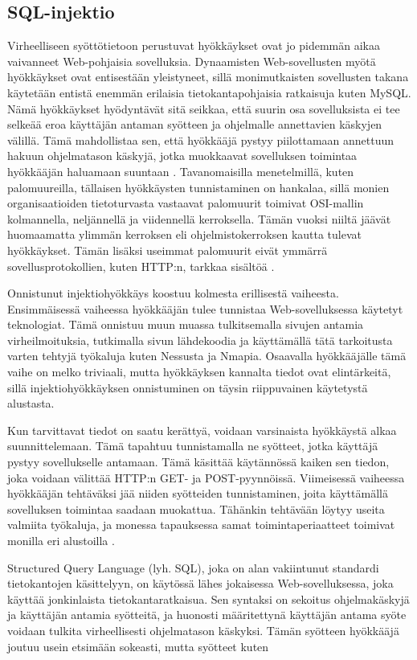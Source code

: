 \subsection{SQL-injektio}

Virheelliseen syöttötietoon perustuvat hyökkäykset ovat jo pidemmän aikaa vaivanneet Web-pohjaisia sovelluksia.
Dynaamisten Web-sovellusten myötä hyökkäykset ovat entisestään yleistyneet, sillä monimutkaisten sovellusten takana käytetään entistä
enemmän erilaisia tietokantapohjaisia ratkaisuja kuten MySQL. Nämä hyökkäykset hyödyntävät sitä seikkaa, että suurin osa
sovelluksista ei tee selkeää eroa käyttäjän antaman syötteen ja ohjelmalle annettavien käskyjen välillä. Tämä mahdollistaa
sen, että hyökkääjä pystyy piilottamaan annettuun hakuun ohjelmatason käskyjä, jotka muokkaavat sovelluksen toimintaa
hyökkääjän haluamaan suuntaan \cite{WEB2}. Tavanomaisilla
menetelmillä, kuten palomuureilla, tällaisen hyökkäysten tunnistaminen on hankalaa, sillä
monien organisaatioiden tietoturvasta vastaavat palomuurit toimivat OSI-mallin
kolmannella, neljännellä ja viidennellä kerroksella. Tämän vuoksi
niiltä jäävät huomaamatta ylimmän kerroksen eli ohjelmistokerroksen
kautta tulevat hyökkäykset. Tämän lisäksi useimmat palomuurit eivät
ymmärrä sovellusprotokollien,
kuten HTTP:n, tarkkaa sisältöä \cite{SQLSS}.    

Onnistunut injektiohyökkäys koostuu kolmesta erillisestä vaiheesta. Ensimmäisessä vaiheessa hyökkääjän tulee tunnistaa 
Web-sovelluksessa käytetyt teknologiat. Tämä onnistuu muun muassa tulkitsemalla sivujen antamia virheilmoituksia, tutkimalla 
sivun lähdekoodia ja käyttämällä tätä tarkoitusta varten tehtyjä työkaluja kuten Nessusta ja Nmapia. Osaavalla hyökkääjälle tämä vaihe on melko triviaali, 
mutta hyökkäyksen kannalta tiedot ovat elintärkeitä, sillä injektiohyökkäyksen onnistuminen on täysin riippuvainen 
käytetystä alustasta.

Kun tarvittavat tiedot on saatu kerättyä, voidaan varsinaista hyökkäystä alkaa suunnittelemaan.
Tämä tapahtuu tunnistamalla ne syötteet, jotka käyttäjä pystyy sovellukselle antamaan. Tämä käsittää käytännössä kaiken sen 
tiedon, joka voidaan välittää HTTP:n GET- ja POST-pyynnöissä. Viimeisessä vaiheessa hyökkääjän tehtäväksi jää niiden syötteiden 
tunnistaminen, joita käyttämällä sovelluksen toimintaa saadaan muokattua. Tähänkin tehtävään löytyy useita valmiita työkaluja, ja
monessa tapauksessa samat toimintaperiaatteet toimivat monilla eri alustoilla \cite{WEB2}.

Structured Query Language (lyh. SQL), joka on alan vakiintunut standardi tietokantojen käsittelyyn, on käytössä lähes jokaisessa
Web-\-sovelluksessa, joka käyttää jonkinlaista tietokantaratkaisua. Sen syntaksi on sekoitus ohjelmakäskyjä ja käyttäjän antamia
syötteitä, ja huonosti määritettynä käyttäjän antama syöte voidaan tulkita virheellisesti ohjelmatason käskyksi. Tämän syötteen
hyökkääjä joutuu usein etsimään sokeasti, mutta syötteet kuten

